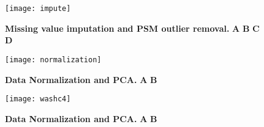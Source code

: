 
\begin{figure}[h] %
  \begin{fullwidth}
  \begin{center}
	  \texttt{[image: impute]}
	  \caption{\textbf{Missing value imputation and PSM outlier removal.}
	  \textbf{A} \textbf{B} \textbf{C} \textbf{D} }
	  \label{fig:impute}
  \end{center}
  \end{fullwidth}
\end{figure}


\begin{figure}[h] %
  \begin{fullwidth}
  \begin{center}
	  \texttt{[image: normalization]}
	  \caption{\textbf{Data Normalization and PCA.} \textbf{A} \textbf{B} }
	  \label{fig:normalization}
  \end{center}
  \end{fullwidth}
\end{figure}


\begin{figure}[h] %
  \begin{fullwidth}
  \begin{center}
	  \texttt{[image: washc4]}
	  \caption{\textbf{Data Normalization and PCA.} \textbf{A} \textbf{B} }
	  \label{fig:washc4}
  \end{center}
  \end{fullwidth}
\end{figure}


